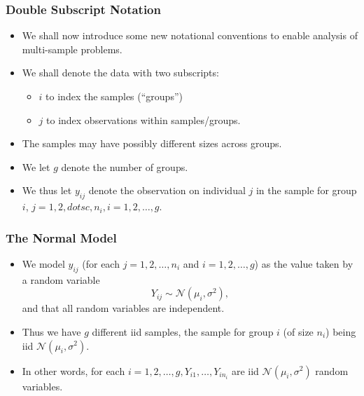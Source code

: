 \documentclass[a4paper]{article}
\begin{document}
\subsubsection{Double Subscript Notation}
\begin{itemize}
	\item We shall now introduce some new notational conventions to enable analysis of multi-sample problems.
	\item We shall denote the data with two subscripts:
	\begin{itemize}
		\item \( i \) to index the samples (``groups'')
		\item \( j \) to index observations within samples/groups.
	\end{itemize}
	\item The samples may have possibly different sizes across groups.
	\item We let \( g \) denote the number of groups.
	\item We thus let \( y_{ij} \) denote the observation on individual \( j \) in the sample for group \( i \), \( j = 1,2,dotsc, n_i, i = 1,2,\dotsc,g \).
\end{itemize}
\subsubsection{The Normal Model}
\begin{itemize}
	\item We model \( y_{ij} \) (for each \( j = 1,2,\dotsc,n_i \) and \( i = 1,2,\dotsc,g \)) as the value taken by a random variable
	\[
		Y_{ij} \sim \mathcal{N} (\mu_i,\sigma^2),
	\]
	and that all random variables are independent.
	\item Thus we have \( g \) different iid samples, the sample for group \( i \) (of size \( n_i \)) being iid \( \mathcal{N} (\mu_i,\sigma^2) \).
	\item In other words, for each \( i = 1,2,\dotsc,g, Y_{i1}, \dotsc, Y_{in_{i}} \) are iid \( \mathcal{N} (\mu_i,\sigma^2) \) random variables.
\end{itemize}
\end{document}
